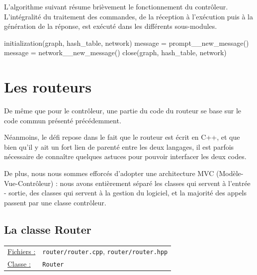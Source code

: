 \documentclass[a4paper,11pt]{article}
\begin{document}
L'algorithme suivant résume brièvement le fonctionnement du contrôleur. L'intégralité du traitement des commandes, de la réception à l'exécution puis à la génération de la réponse, est exécuté dans les différents sous-modules.

\begin{algorithm}[H]
 initialization(graph, hash\_table, network)\;
  {
 	message = prompt\_\_new\_message()\;
 	\BlankLine
 	message = network\_\_new\_message()\;
 	\BlankLine
 }
 close(graph, hash\_table, network)\;
\end{algorithm}

\section{Les routeurs} %

De même que pour le contrôleur, une partie du code du routeur se base sur le code commun présenté précédemment.

Néanmoins, le défi repose dans le fait que le routeur est écrit en C++, et que bien qu'il y ait un fort lien de parenté
entre les deux langages, il est parfois nécessaire de connaître quelques astuces pour pouvoir interfacer les deux codes.

De plus, nous nous sommes efforcés d'adopter une architecture MVC (Modèle-Vue-Contrôleur) : nous avons entièrement séparé les classes qui servent
à l'entrée - sortie, des classes qui servent à la gestion du logiciel, et la majorité des appels passent par une classe contrôleur.

\subsection{La classe Router}

\begin{tabularx}{\linewidth}{lX}
\underline{Fichiers :} & \texttt{router/router.cpp}, \texttt{router/router.hpp}\\
\underline{Classe :} & \texttt{Router}\\
\end{tabularx}\\
\end{document}
